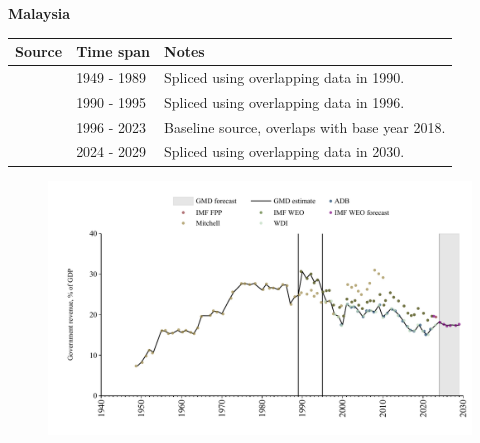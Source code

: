 \documentclass[12pt,a4paper,landscape]{article}
\begin{document}
\begin{adjustbox}{max totalsize={\paperwidth}{\paperheight},center}
\begin{minipage}[t][\textheight][t]{\textwidth}
\vspace*{0.5cm}
{}
\begin{center}
{\Large\bfseries Malaysia}
\end{center}
\vspace{0.5cm}
\begin{table}[H]
\centering
\small
\begin{tabular}{|l|l|l|}
\hline
\textbf{Source} & \textbf{Time span} & \textbf{Notes} \\
\hline
\rowcolor{white}\cite{Mitchell}& 1949 - 1989 &Spliced using overlapping data in 1990.\\
\rowcolor{lightgray}\cite{IMF_WEO}& 1990 - 1995 &Spliced using overlapping data in 1996.\\
\rowcolor{white}\cite{WDI}& 1996 - 2023 &Baseline source, overlaps with base year 2018.\\
\rowcolor{lightgray}\cite{IMF_WEO_forecast}& 2024 - 2029 &Spliced using overlapping data in 2030.\\
\hline
\end{tabular}
\end{table}
\begin{figure}[H]
\centering
\includegraphics[width=\textwidth,height=0.6\textheight,keepaspectratio]{graphs/MYS_govrev_GDP.pdf}
\end{figure}
\end{minipage}
\end{adjustbox}
\end{document}
